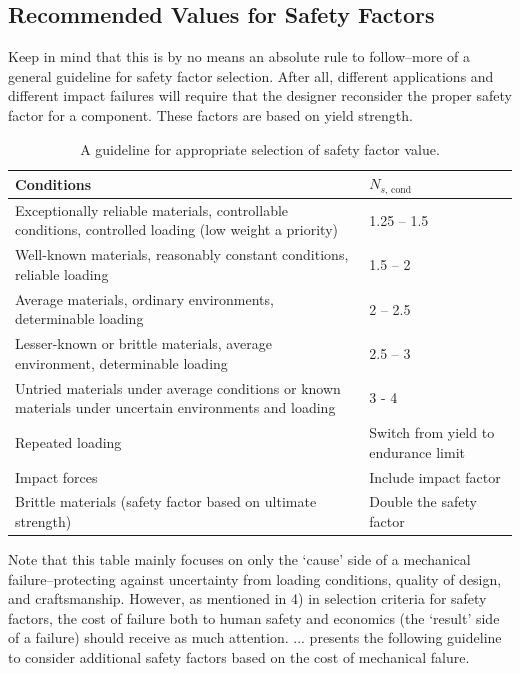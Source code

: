 \documentclass[
10pt,
a4paper,
openany,
svgnames,
]{book}
\begin{document}
\subsection{Recommended Values for Safety Factors}

Keep in mind that this is by no means an absolute rule to follow--more of a general guideline for safety factor selection. After all, different applications and different impact failures will require that the designer reconsider the proper safety factor for a component. These factors are based on yield strength.

\begin{table}[h]
  \centering
  \caption{A guideline for appropriate selection of safety factor value.}
  \label{table: safety factor guideline}
  {\renewcommand{\arraystretch}{1.5}
  \begin{tabular}{ L{7cm} C{5cm} }
    \toprule
     Conditions & $N_{s\text{, cond}}$ \\
    \midrule
    Exceptionally reliable materials, controllable conditions, controlled loading (low weight a priority) & 1.25 – 1.5 \\
     Well-known materials, reasonably constant conditions, reliable loading & 1.5 – 2 \\
    Average materials, ordinary environments, determinable loading & 2 – 2.5 \\
     Lesser-known or brittle materials, average environment, determinable loading & 2.5 – 3 \\
    Untried materials under average conditions or known materials under uncertain environments and loading & 3 - 4 \\
     Repeated loading & Switch from yield to endurance limit \\
    Impact forces & Include impact factor \\
     Brittle materials (safety factor based on ultimate strength) & Double the safety factor \\
    \bottomrule
  \end{tabular}}
\end{table}

Note that this table mainly focuses on only the `cause' side of a mechanical failure--protecting against uncertainty from loading conditions, quality of design, and craftsmanship. However, as mentioned in 4) in selection criteria for safety factors, the cost of failure both to human safety and economics (the `result' side of a failure) should receive as much attention. ... presents the following guideline to consider additional safety factors based on the cost of mechanical falure.
\end{document}
